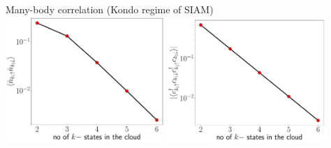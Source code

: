 \documentclass[aspectratio=169]{beamer}
\begin{document}
\begin{frame}[noframenumbering]{Many-body correlation (Kondo regime of SIAM)}
	\includegraphics[width=0.45\textwidth]{figures/corr_opp.pdf}
	\includegraphics[width=0.45\textwidth]{figures/corr_od.pdf}
\end{frame}
\end{document}
